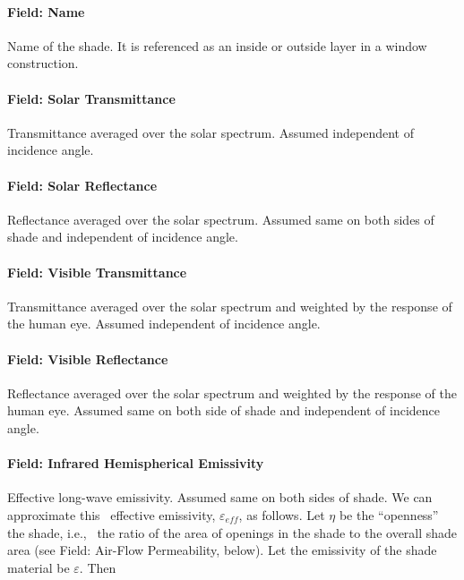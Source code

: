 \paragraph{Field: Name}\label{field-name-16-009}

Name of the shade. It is referenced as an inside or outside layer in a window construction.

\paragraph{Field: Solar Transmittance}\label{field-solar-transmittance}

Transmittance averaged over the solar spectrum. Assumed independent of incidence angle.

\paragraph{Field: Solar Reflectance}\label{field-solar-reflectance}

Reflectance averaged over the solar spectrum. Assumed same on both sides of shade and independent of incidence angle.

\paragraph{Field: Visible Transmittance}\label{field-visible-transmittance-1}

Transmittance averaged over the solar spectrum and weighted by the response of the human eye. Assumed independent of incidence angle.

\paragraph{Field: Visible Reflectance}\label{field-visible-reflectance}

Reflectance averaged over the solar spectrum and weighted by the response of the human eye. Assumed same on both side of shade and independent of incidence angle.

\paragraph{Field: Infrared Hemispherical Emissivity}\label{field-infrared-hemispherical-emissivity-201710020805}

Effective long-wave emissivity. Assumed same on both sides of shade. We can approximate this~ effective emissivity, \(\varepsilon_{eff}\), as follows. Let \(\eta\) be the ``openness'' the shade, i.e.,~ the ratio of the area of openings in the shade to the overall shade area (see Field: Air-Flow Permeability, below). Let the emissivity of the shade material be \(\varepsilon\). Then

